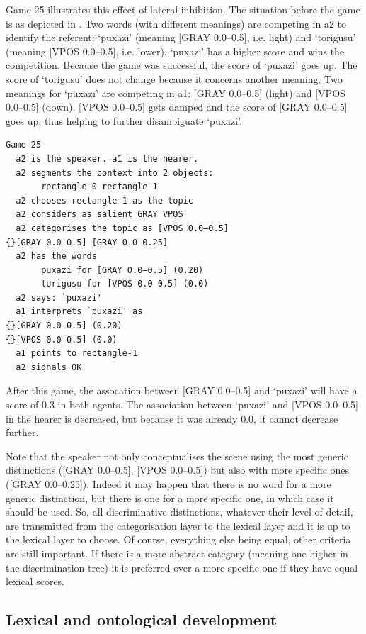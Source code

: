 Game 25 illustrates this effect of 
lateral inhibition. The situation before the game is 
as depicted in . 
Two words (with different meanings) are competing in {\bfshape  a2} to 
identify the referent: `puxazi' (meaning 
{}[GRAY 0.0–0.5], i.e. light) and `torigusu'
(meaning [VPOS 0.0–0.5], i.e. lower).  `puxazi' has
a higher score and wins the competition. Because the game 
was successful, the score
of `puxazi' goes up. The score of `torigusu' 
does not change because it concerns another 
meaning. Two meanings for `puxazi'
are competing in {\bfshape  a1}: [GRAY 0.0–0.5] (light)
and [VPOS 0.0–0.5] (down). [VPOS 0.0–0.5] gets damped and 
the score of [GRAY 0.0–0.5] goes up, thus helping to 
further disambiguate `puxazi'. 
\begin{verbatim}
Game 25
  a2 is the speaker. a1 is the hearer. 
  a2 segments the context into 2 objects: 
       rectangle-0 rectangle-1 
  a2 chooses rectangle-1 as the topic 
  a2 considers as salient GRAY VPOS
  a2 categorises the topic as [VPOS 0.0–0.5] 
{}[GRAY 0.0–0.5] [GRAY 0.0–0.25]
  a2 has the words
       puxazi for [GRAY 0.0–0.5] (0.20)
       torigusu for [VPOS 0.0–0.5] (0.0)
  a2 says: `puxazi'
  a1 interprets `puxazi' as
{}[GRAY 0.0–0.5] (0.20)
{}[VPOS 0.0–0.5] (0.0)
  a1 points to rectangle-1
  a2 signals OK
\end{verbatim}
After this game, the assocation between [GRAY 0.0–0.5] 
and `puxazi' will have a score of 0.3 in both agents. 
The association between `puxazi' and [VPOS 0.0–0.5] 
in the hearer is decreased, but because it was already 
0.0, it cannot decrease further. 

Note that the speaker not only conceptualises the scene using 
the most generic distinctions ([GRAY 0.0–0.5], 
{}[VPOS 0.0–0.5]) but also
with more specific ones ([GRAY 0.0–0.25]). Indeed it 
may happen that there is no word for a more generic 
distinction, but there is one for a more specific 
one, in which case it should be used. 
So, all discriminative distinctions, 
whatever their level of detail, are
transmitted from the categorisation layer to the 
lexical layer and it is up to the lexical layer
to choose. Of course, everything else being equal, 
other criteria are still important. If there is a 
more abstract category (meaning one higher in the 
discrimination tree) it is preferred over a more 
specific one if they have equal lexical scores. 

\subsection{Lexical and ontological development} 

